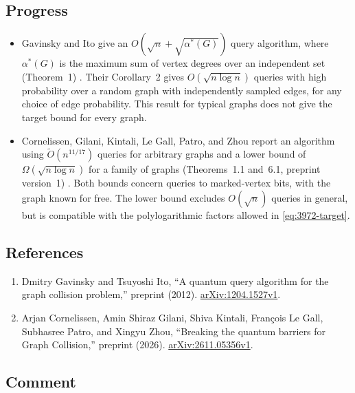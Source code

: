 \subsection*{Progress}

\begin{itemize}
  \item Gavinsky and Ito give an
$O(\sqrt n+\sqrt{\alpha^*(G)})$ query algorithm, where
$\alpha^*(G)$ is the maximum sum of vertex degrees over an independent set
(Theorem~1) .
Their Corollary~2 gives $O(\sqrt{n\log n})$ queries with high probability
over a random graph with independently sampled edges, for any choice of edge probability.
This result for typical graphs does not give the target bound for every graph.

  \item Cornelissen, Gilani, Kintali, Le Gall, Patro, and Zhou report an algorithm
using $\widetilde O(n^{11/17})$ queries for arbitrary graphs and a lower bound
of $\Omega(\sqrt{n\log n})$ for a family of graphs
(Theorems~1.1 and~6.1, preprint version~1)
.
Both bounds concern queries to marked-vertex bits, with the graph known for free.
The lower bound excludes $O(\sqrt n)$ queries in general, but is compatible
with the polylogarithmic factors allowed in \eqref{eq:3972-target}.
\end{itemize}

\subsection*{References}

\begin{enumerate}[label={},leftmargin=4.8em,labelsep=0.5em]
  \footnotesize
  \item[\textup{[GI12]}]\label{ref:3972-gi}
  Dmitry Gavinsky and Tsuyoshi Ito,
``A quantum query algorithm for the graph collision problem,'' preprint (2012).
\href{https://arxiv.org/abs/1204.1527v1}{arXiv:1204.1527v1}.

  \item[\textup{[CGKLPZ26]}]\label{ref:3972-cgklpz}
  Arjan Cornelissen, Amin Shiraz Gilani, Shiva Kintali, Fran\c{c}ois Le Gall,
Subhasree Patro, and Xingyu Zhou,
``Breaking the quantum barriers for Graph Collision,'' preprint (2026).
\href{https://arxiv.org/abs/2611.05356v1}{arXiv:2611.05356v1}.
\end{enumerate}

\subsection*{Comment}

